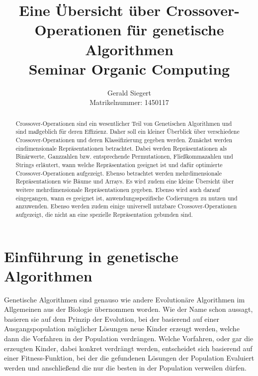 \documentclass{llncs}
\begin{document}
\mainmatter

\title{Eine Übersicht über Crossover-Operationen für genetische Algorithmen\\Seminar Organic Computing}

\author{Gerald Siegert\\Matrikelnummer: 1450117}
\tocauthor{}


\maketitle


\begin{abstract}
	Crossover-Operationen sind ein wesentlicher Teil von Genetischen Algorithmen und sind maßgeblich für deren Effizienz. Daher soll ein kleiner Überblick über verschiedene Crossover-Operationen und deren Klassifizierung gegeben werden. Zunächst werden eindimensionale Re\-prä\-sen\-ta\-ti\-on\-en betrachtet. Dabei werden Repräsentationen als Binärwerte, Ganzzahlen bzw. entsprechende Permutationen, Fließkommazahlen und Strings  erläutert, wann welche Repräsentation geeignet ist und dafür optimierte Crossover-Operationen aufgezeigt. Ebenso betrachtet werden mehrdimensionale Re\-prä\-sen\-ta\-ti\-on\-en wie Bäume und Arrays. Es wird zudem eine kleine Über\-sicht über weitere mehrdimensionale Repräsentationen gegeben. Ebenso wird auch darauf eingegangen, wann es geeignet ist, anwendungsspezifische Codierungen zu nutzen und anzuwenden. Ebenso werden zudem einige universell nutzbare Crossover-Operationen aufgezeigt, die nicht an eine spezielle Repräsentation gebunden sind.
\end{abstract}

\pagebreak

\section{Einführung in genetische Algorithmen}
\label{sec:EinfuhrungGA}

	Genetische Algorithmen sind genauso wie andere Evolutionäre Algorithmen im Allgemeinen aus der Biologie übernommen worden. Wie der Name schon aussagt, basieren sie auf dem Prinzip der Evolution, bei der basierend auf einer Ausgangspopulation möglicher Lösungen neue Kinder erzeugt werden, welche dann die Vorfahren in der Population verdrängen. Welche Vorfahren, oder gar die erzeugten Kinder, dabei konkret verdrängt werden, entscheidet sich basierend auf einer Fitness-Funktion, bei der die gefundenen Lösungen der Population Evaluiert werden und anschließend die nur die besten in der Population verweilen dürfen.
	
\end{document}
